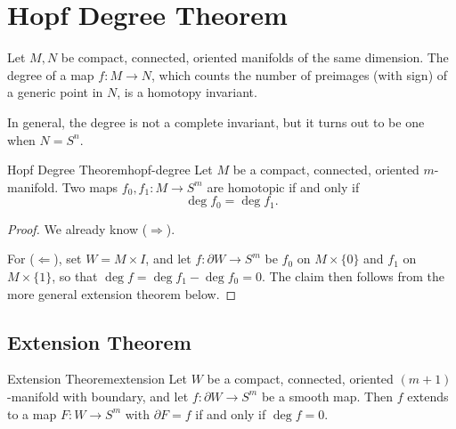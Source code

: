 
\section{Hopf Degree Theorem}

Let $M, N$ be compact, connected, oriented manifolds of the same dimension. The degree of a map $f \colon M \to N$, which counts the number of preimages (with sign) of a generic point in $N$, is a homotopy invariant.

In general, the degree is not a complete invariant, but it turns out to be one when $N = S^n$.

\begin{theorem}{Hopf Degree Theorem}{hopf-degree}
    Let $M$ be a compact, connected, oriented $m$-manifold. Two maps $f_0, f_1 \colon M \to S^m$ are homotopic if and only if
    \[
        \deg f_0 = \deg f_1.
    \]
\end{theorem}

\begin{proof}
    We already know ($\Rightarrow$).

    For ($\Leftarrow$), set $W = M \times I$, and let $f \colon \partial W \to S^m$ be $f_0$ on $M \times \{0\}$ and $f_1$ on $M \times \{1\}$, so that $\deg f = \deg f_1 - \deg f_0 = 0$. The claim then follows from the more general extension theorem below.
\end{proof}

\subsection{Extension Theorem}

\begin{theorem}{Extension Theorem}{extension}
    Let $W$ be a compact, connected, oriented $(m+1)$-manifold with boundary, and let $f \colon \partial W \to S^m$ be a smooth map. Then $f$ extends to a map $F \colon W \to S^m$ with $\partial F = f$ if and only if $\deg f = 0$.
\end{theorem}


